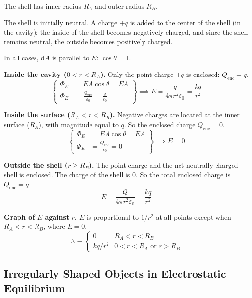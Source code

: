 \documentclass{article}
\begin{document}
The shell has inner radius $R_A$ and outer radius $R_B$.

The shell is initially neutral. A charge $+q$ is added to the center of the shell (in the cavity); the inside of the shell becomes negatively charged, and since the shell remains neutral, the outside becomes positively charged.

In all cases, $\mathrm{d}A$ is parallel to $E$: $\cos\theta=1$.

\textbf{Inside the cavity ($0<r<R_A$).} 
Only the point charge $+q$ is enclosed: $Q_\text{enc}=q$.
\begin{equation*}
	\left\{\begin{aligned}
		\Phi_E&=EA\cos\theta=EA \\
		\Phi_E&=\frac{Q_\text{enc}}{\varepsilon_0}=\frac{q}{\varepsilon_0}
	\end{aligned}\right\}
	\implies E=\frac{q}{4\pi r^2\varepsilon_0}=\boxed{\frac{kq}{r^2}}
\end{equation*}

\textbf{Inside the surface ($R_A<r<R_B$).}
Negative charges are located at the inner surface ($R_A$), with magnitude equal to $q$. So the enclosed charge $Q_\text{enc}=0$.
\begin{equation*}
	\left\{\begin{aligned}
		\Phi_E&=EA\cos\theta=EA \\
		\Phi_E&=\frac{Q_\text{enc}}{\varepsilon_0}=0
	\end{aligned}\right\}
	\implies E=\boxed{0}
\end{equation*}

\textbf{Outside the shell ($r\geq R_B$).}
The point charge and the net neutrally charged shell is enclosed. The charge of the shell is $0$. So the total enclosed charge is $Q_\text{enc}=q$.
\begin{equation*}
	E=\frac{Q}{4\pi r^2\varepsilon_0}=\boxed{\frac{kq}{r^2}}
\end{equation*}

\textbf{Graph of $E$ against $r$.} $E$ is proportional to $1/r^2$ at all points except when $R_A<r<R_B$, where $E=0$.
\begin{equation*}
    E=\begin{cases}
		0 & R_A<r<R_B \\
		kq/r^2 & 0<r<R_A \text{ or } r>R_B
    \end{cases}
\end{equation*}

\subsection{Irregularly Shaped Objects in Electrostatic Equilibrium}
\end{document}
